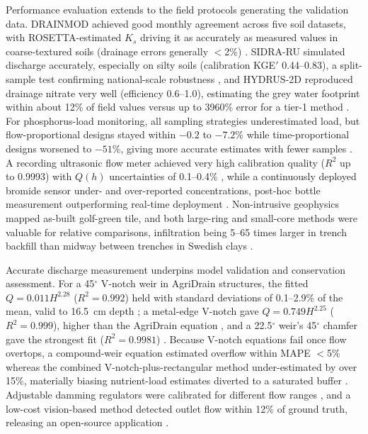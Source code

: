 \documentclass[11pt]{article}
\begin{document}
Performance evaluation extends to the field protocols generating the validation data. \textsc{DRAINMOD} achieved good monthly agreement across five soil datasets, with ROSETTA-estimated $K_s$ driving it as accurately as measured values in coarse-textured soils (drainage errors generally $<$2\%) \parencite{Salazar2008}. \textsc{SIDRA-RU} simulated discharge accurately, especially on silty soils (calibration KGE$'$ 0.44--0.83), a split-sample test confirming national-scale robustness \parencite{Jeantet2021}, and HYDRUS-2D reproduced drainage nitrate very well (efficiency 0.6--1.0), estimating the grey water footprint within about 12\% of field values versus up to 3960\% error for a tier-1 method \parencite{Naderi2025}. For phosphorus-load monitoring, all sampling strategies underestimated load, but flow-proportional designs stayed within $-0.2$ to $-7.2$\% while time-proportional designs worsened to $-51$\%, giving more accurate estimates with fewer samples \parencite{Dialameh2022}. A recording ultrasonic flow meter achieved very high calibration quality ($R^2$ up to 0.9993) with $Q(h)$ uncertainties of 0.1--0.4\% \parencite{Enamorado2007}, while a continuously deployed bromide sensor under- and over-reported concentrations, post-hoc bottle measurement outperforming real-time deployment \parencite{deOliveira2023b}. Non-intrusive geophysics mapped as-built golf-green tile, and both large-ring and small-core methods were valuable for relative comparisons, infiltration being 5--65 times larger in trench backfill than midway between trenches in Swedish clays \parencite{Freeland2014,Messing2006,BUCKLAND1986}.

Accurate discharge measurement underpins model validation and conservation assessment. For a 45$^\circ$ V-notch weir in AgriDrain structures, the fitted $Q=0.011H^{2.28}$ ($R^2=0.992$) held with standard deviations of 0.1--2.9\% of the mean, valid to 16.5~cm depth \parencite{Christianson2019}; a metal-edge V-notch gave $Q=0.749H^{2.25}$ ($R^2=0.999$), higher than the AgriDrain equation \parencite{BinShokrana2021}, and a 22.5$^\circ$ weir's 45$^\circ$ chamfer gave the strongest fit ($R^2=0.9981$) \parencite{Napierala2023}. Because V-notch equations fail once flow overtops, a compound-weir equation estimated overflow within MAPE $<$5\% whereas the combined V-notch-plus-rectangular method under-estimated by over 15\%, materially biasing nutrient-load estimates diverted to a saturated buffer \parencite{Katuwal2024}. Adjustable damming regulators were calibrated for different flow ranges \parencite{Popek2021}, and a low-cost vision-based method detected outlet flow within 12\% of ground truth, releasing an open-source application \parencite{Young2023}.
\end{document}
